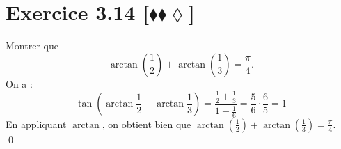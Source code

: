 \documentclass[10pt]{article}
\begin{document}

\section*{Exercice 3.14 [$\blacklozenge\blacklozenge\lozenge$]}
\begin{tcolorbox}[enhanced, width=6in, center, size=fbox, fontupper=\large, drop shadow southwest]
    Montrer que
    \begin{equation*}
        \arctan\left(\frac{1}{2}\right)+\arctan\left(\frac{1}{3}\right)=\frac{\pi}{4}.
    \end{equation*}
    On a :
    \begin{equation*}
        \tan\left(\arctan\frac{1}{2}+\arctan\frac{1}{3}\right)
        =\frac{\frac{1}{2}+\frac{1}{3}}{1-\frac{1}{6}}
        =\frac{5}{6}\cdot\frac{6}{5}
        =1
    \end{equation*}
    En appliquant $\arctan$, on obtient bien que $\arctan\left(\frac{1}{2}\right)+\arctan\left(\frac{1}{3}\right)=\frac{\pi}{4}.$\\
    \qed
\end{tcolorbox}

\end{document}
